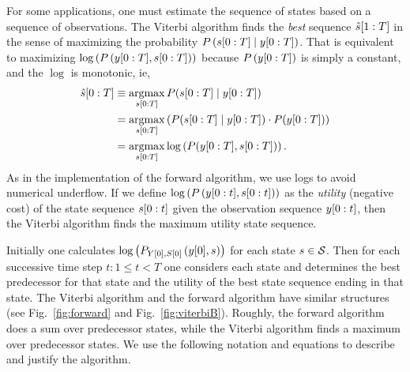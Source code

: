 For some applications, one must estimate the sequence of states based
on a sequence of observations.  The Viterbi algorithm %
%
finds the \emph{best} sequence $\hat s[1:T]$ in the sense of
maximizing the probability $P\left( s[0:T]\mid y[0:T]
\right)$.  That is equivalent to maximizing $\log \left( P\left(
    y[0:T],s[0:T] \right) \right)$ because $P \left(
  y[0:T] \right)$ is simply a constant, and the $\log$ is
monotonic, ie,
\begin{align*}
  \hat s[0:T] &\equiv \operatorname*{argmax}_{s[0:T]}
  P(s[0:T]\mid y[0:T])\\
  &= \operatorname*{argmax}_{s[0:T]} \left( P(s[0:T]\mid y[0:T]) \cdot
    P(y[0:T]) \right)\\
  &= \operatorname*{argmax}_{s[0:T]} \log \left( P(y[0:T],s[0:T])
  \right).
\end{align*}
As in the implementation of the forward algorithm, we use logs to
avoid numerical underflow.  If we define $\log \left( P\left(
    y[0:t], s[0:t] \right) \right)$ as the
\emph{utility} (negative cost) of the state sequence $s[0:t]$
given the observation sequence $y[0:t]$, then the Viterbi
algorithm finds the maximum utility state sequence.

Initially one calculates
$\log\left(P_{{Y}{[0]},{S}{[0]}} \left({y}{[0]}, s \right) \right)$
for each state $s \in \states$.  Then for each successive time step
$t: 1 \leq t < T$ one considers each state and determines the best
predecessor for that state and the utility of the best state sequence
ending in that state.  The Viterbi algorithm and the forward algorithm
have similar structures (see Fig.~\ref{fig:forward} and
Fig.~\ref{fig:viterbiB}).  Roughly, the forward algorithm does a sum
over predecessor states, while the Viterbi algorithm finds a maximum
over predecessor states. We use the following notation and equations
to describe and justify the algorithm.

